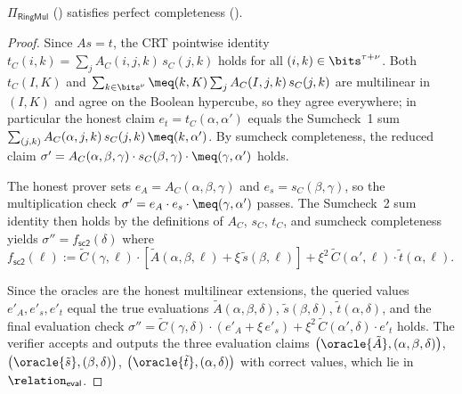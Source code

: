 \begin{theorem}
\label{thm:completeness}
$\Pi_{\mathsf{RingMul}}$ () satisfies perfect completeness ().
\end{theorem}
\begin{proof}
Since $As = t$, the CRT pointwise identity $t_C(i,k) = \sum_j A_C(i,j,k)\,s_C(j,k)$ holds for all $(i,k) \in \bits^{\tau+\nu}$. Both $t_C(I,K)$ and $\sum_{k\in\bits^\nu}\meq(k,K)\sum_j A_C(I,j,k)\,s_C(j,k)$ are multilinear in $(I,K)$ and agree on the Boolean hypercube, so they agree everywhere; in particular the honest claim $e_t = t_C(\alpha,\alpha')$ equals the Sumcheck~1 sum $\sum_{(j,k)}A_C(\alpha,j,k)\,s_C(j,k)\,\meq(k,\alpha')$. By sumcheck completeness, the reduced claim $\sigma' = A_C(\alpha,\beta,\gamma)\cdot s_C(\beta,\gamma)\cdot\meq(\gamma,\alpha')$ holds.

The honest prover sets $e_A = A_C(\alpha,\beta,\gamma)$ and $e_s = s_C(\beta,\gamma)$, so the multiplication check $\sigma' = e_A \cdot e_s \cdot \meq(\gamma,\alpha')$ passes. The Sumcheck~2 sum identity then holds by the definitions of $A_C$, $s_C$, $t_C$, and sumcheck completeness yields $\sigma'' = f_{\mathsf{sc2}}(\delta)$ where $f_{\mathsf{sc2}}(\ell) := \tilde{C}(\gamma,\ell)\cdot[\tilde{A}(\alpha,\beta,\ell)+\xi\,\tilde{s}(\beta,\ell)] + \xi^2\,\tilde{C}(\alpha',\ell)\cdot\tilde{t}(\alpha,\ell)$.

Since the oracles are the honest multilinear extensions, the queried values $e'_A,e'_s,e'_t$ equal the true evaluations $\tilde{A}(\alpha,\beta,\delta)$, $\tilde{s}(\beta,\delta)$, $\tilde{t}(\alpha,\delta)$, and the final evaluation check $\sigma'' = \tilde{C}(\gamma,\delta)\cdot(e'_A + \xi\,e'_s) + \xi^2\,\tilde{C}(\alpha',\delta)\cdot e'_t$ holds. The verifier accepts and outputs the three evaluation claims $\bigl(\oracle{\tilde{A}},(\alpha,\beta,\delta)\bigr)$, $\bigl(\oracle{\tilde{s}},(\beta,\delta)\bigr)$, $\bigl(\oracle{\tilde{t}},(\alpha,\delta)\bigr)$ with correct values, which lie in $\relation_{\mathsf{eval}}$.
\end{proof}